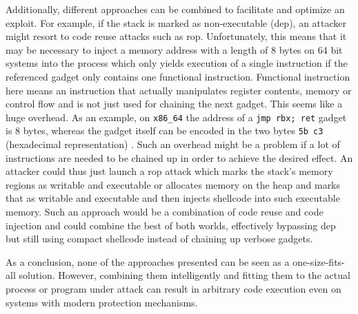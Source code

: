 Additionally, different approaches can be combined to facilitate and optimize an exploit.
For example, if the stack is marked as non-executable (\gls{dep}), an attacker might resort to code reuse attacks such as \gls{rop}.
Unfortunately, this means that it may be necessary to inject a memory address with a length of 8 bytes on 64 bit systems into the process which only yields execution of a single instruction if the referenced gadget only contains one functional instruction.
Functional instruction here means an instruction that actually manipulates register contents, memory or control flow and is not just used for chaining the next gadget.
This seems like a huge overhead.
As an example, on \texttt{x86\_64} the address of a \texttt{jmp rbx; ret} gadget is 8 bytes, whereas the gadget itself can be encoded in the two bytes \texttt{5b c3} (hexadecimal representation) \cite[3-2\psq,4-390,4-555]{IntelCorporation2020}.
Such an overhead might be a problem if a lot of instructions are needed to be chained up in order to achieve the desired effect.
An attacker could thus just launch a \gls{rop} attack which marks the stack's memory regions as writable and executable or allocates memory on the heap and marks that as writable and executable and then injects shellcode into such executable memory.
Such an approach would be a combination of code reuse and code injection and could combine the best of both worlds, effectively bypassing \gls{dep} but still using compact shellcode instead of chaining up verbose gadgets.

As a conclusion, none of the approaches presented can be seen as a one-size-fits-all solution.
However, combining them intelligently and fitting them to the actual process or program under attack can result in arbitrary code execution even on systems with modern protection mechanisms.



